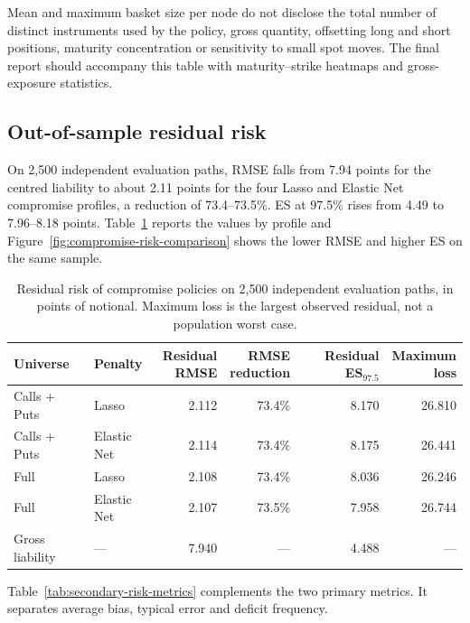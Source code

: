 Mean and maximum basket size per node do not disclose the total number of distinct
instruments used by the policy, gross quantity, offsetting long and short positions,
maturity concentration or sensitivity to small spot moves. The
final report should accompany this table with maturity--strike heatmaps and
gross-exposure statistics.

\subsection{Out-of-sample residual risk}

On 2,500 independent evaluation paths, RMSE falls from 7.94 points for the centred liability to about 2.11 points for the four Lasso and Elastic Net compromise profiles, a reduction of 73.4--73.5\%. ES at 97.5\% rises from 4.49 to 7.96--8.18 points. Table~\ref{tab:risk} reports the values by profile and Figure~\ref{fig:compromise-risk-comparison} shows the lower RMSE and higher ES on the same sample.

\begin{table}[htbp]
\centering
\small
\begin{tabular}{llrrrr}
\toprule
Universe & Penalty & \shortstack[r]{Residual\\RMSE} & \shortstack[r]{RMSE\\reduction} & \shortstack[r]{Residual\\ES$_{97.5}$} & \shortstack[r]{Maximum\\loss} \\
\midrule
Calls + Puts & Lasso & 2.112 & 73.4\% & 8.170 & 26.810 \\
Calls + Puts & Elastic Net & 2.114 & 73.4\% & 8.175 & 26.441 \\
Full & Lasso & 2.108 & 73.4\% & 8.036 & 26.246 \\
Full & Elastic Net & 2.107 & 73.5\% & 7.958 & 26.744 \\
\midrule
Gross liability & --- & 7.940 & --- & 4.488 & --- \\
\bottomrule
\end{tabular}
\caption{Residual risk of compromise policies on 2,500 independent evaluation paths, in points of notional. Maximum loss is the largest observed residual, not a population worst case.}
\label{tab:risk}
\end{table}

Table~\ref{tab:secondary-risk-metrics} complements the two primary metrics. It
separates average bias, typical error and deficit frequency.

